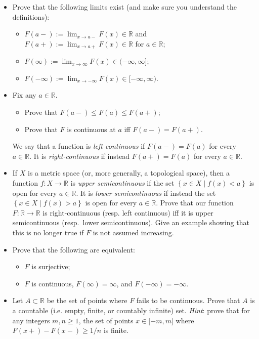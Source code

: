 \begin{itemize}
\item
  Prove that the following limits exist (and make sure you understand the definitions):

  \begin{itemize}
  \item
    \(F(a - ) := \lim_{x\rightarrow a -}F(x) \in \mathbb{R}\) and \(F(a + ) := \lim_{x\rightarrow a +}F(x) \in \mathbb{R}\) for \(a \in \mathbb{R}\);
  \item
    \(F(\infty) := \lim_{x\rightarrow\infty}F(x) \in ( - \infty,\infty\rbrack\);
  \item
    \(F( - \infty) := \lim_{x\rightarrow - \infty}F(x) \in \lbrack - \infty,\infty)\).
  \end{itemize}
\item
  Fix any \(a \in \mathbb{R}\).

  \begin{itemize}
  \item
    Prove that \(F(a - ) \leq F(a) \leq F(a + )\);
  \item
    Prove that \(F\) is continuous at \(a\) iff \(F(a - ) = F(a + )\).
  \end{itemize}

  We say that a function is \emph{left continuous} if \(F(a - ) = F(a)\) for every \(a \in \mathbb{R}\). It is \emph{right-continuous} if instead \(F(a + ) = F(a)\) for every \(a \in \mathbb{R}\).
\item
  If \(X\) is a metric space (or, more generally, a topological space), then a function \(f:X\rightarrow\mathbb{R}\) is \emph{upper semicontinuous} if the set \(\left\{ {x \in X \mid f(x) < a} \right\}\) is open for every \(a \in \mathbb{R}\). It is \emph{lower semicontinuous} if instead the set \(\left\{ {x \in X \mid f(x) > a} \right\}\) is open for every \(a \in \mathbb{R}\). Prove that our function \(F:\mathbb{R}\rightarrow\mathbb{R}\) is right-continuous (resp. left continuous) iff it is upper semicontinuous (resp.~lower semicontinuous). Give an example showing that this is no longer true if \(F\) is not assumed increasing.
\item
  Prove that the following are equivalent:

  \begin{itemize}
  \item
    \(F\) is surjective;
  \item
    \(F\) is continuous, \(F(\infty) = \infty\), and \(F( - \infty) = - \infty\).
  \end{itemize}
\item
  Let \(A \subset \mathbb{R}\) be the set of points where \(F\) fails to be continuous. Prove that \(A\) is a countable (i.e. empty, finite, or countably infinite) set. \emph{Hint}: prove that for any integers \(m,n \geq 1\), the set of points \(x \in \lbrack - m,m\rbrack\) where \(F(x + ) - F(x - ) \geq 1/n\) is finite.
\end{itemize}

